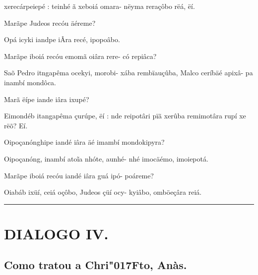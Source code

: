 \documentclass[openany,titlepage,12pt]{book}
\renewcommand{\chaptermark}[1]{\markboth{#1}{}}
\renewcommand{\sectionmark}[1]{\gdef\rightmark{#1}}
\newcommand{\lgS}{\char"017F}
\newcommand{\lgSS}{\char"017F\char"017F}
\begin{document}
\begin{alternate}
    xerecárpeiepé : teinhé ã xeboiá omara-\linebreak
    nëyma reraçôbo rëá, ëí.
    \item Marãpe Judeos recóu äéreme?
    \item Opá icyki iandpe iÂra recé, ipopoâbo.
    \item Marãpe iboiá recóu emomã oiâra rere-
    có repiâca?
    \item Saõ Pedro itngapêma ocekyi, morobi-\pagebreak
    \linebreak xába rembïauçûba, Malco ceríbäé apixâ-
    pa inambí mondôca.
    \item Marã ëípe iande iâra ixupé?
    \item Eimondéb itangapêma çurúpe, ëí : nde
    reipotâri pïã xerûba remimotâra rupí xe
    rëõ? Eí.
    \item Oipoçanónghipe iandé iâra äé imambí
    mondokipyra?
    \item Oipoçanóng, inambí ato\~ia nhóte, aunhé-
    nhé imocäémo, imoiepotá.
    \item Marãpe iboiá recóu iandé iâra guá ipó-
    poáreme?
    \item Oiabáb ixüí, ceiá oçôbo, Judeos çüí ocy-
    kyiâbo, omböeçâra reiá.
    

\end{alternate}


\vspace{2pt}
\par\noindent\rule{\textwidth}{0.4pt}
\unskip\vspace*{2pt}
\section{DIALOGO IV.}
\subsection{Como tratou a Chri\lgS to, Anàs.}

\chaptermark{Dialogo IV.}
\sectionmark{Do que pa\lgSS ou com Anás}
\vspace*{2pt}
\end{document}
